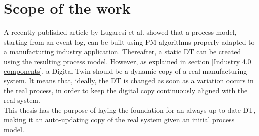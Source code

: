 \chapter{Scope of the work}
\label{chapter 2}
\ifpdf
    \graphicspath{{Chapter2/Figs/}{Chapter2/Figs/PDF/}{Chapter2/Figs/}}
\else
    \graphicspath{{Chapter2/Figs/Vector/}{Chapter2/Figs/}}
\fi
A recently published article by Lugaresi et al. \cite{LugaresiG.2019MsmG} showed that a process model, starting from an event log, can be built using PM algorithms properly adapted to a manufacturing industry application. Thereafter, a static DT can be created using the resulting process model. However, as explained in section \ref{Industry 4.0 components}, a Digital Twin should be a dynamic copy of a real manufacturing system. It means that, ideally, the DT is changed as soon as a variation occurs in the real process, in order to keep the digital copy continuously aligned with the real system. \\
This thesis has the purpose of laying the foundation for an always up-to-date DT, making it an auto-updating copy of the real system given an initial process model. \\
